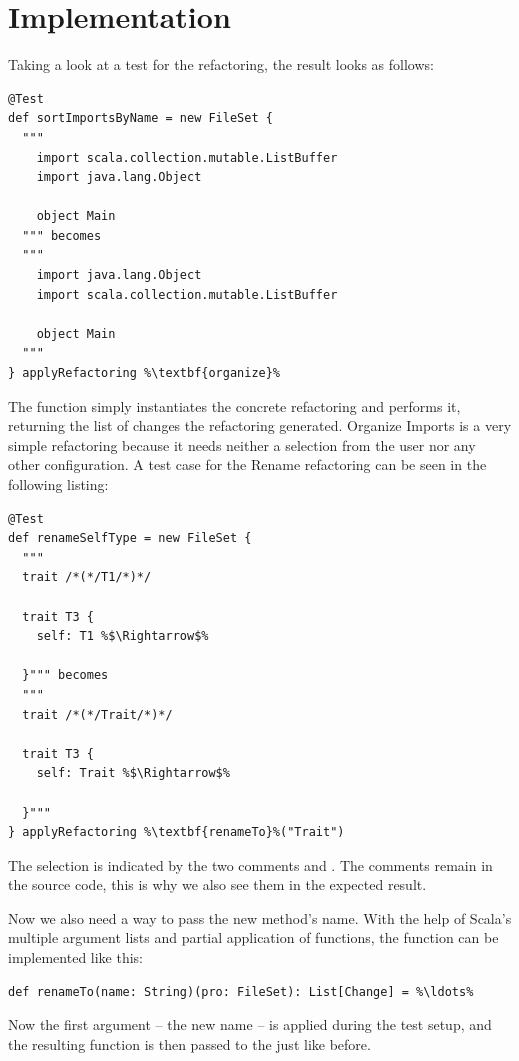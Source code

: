 \documentclass[10pt,a4paper,oneside]{scrreprt}
\begin{document}
\section{Implementation}

Taking a look at a test for the  refactoring, the result looks as follows:
\begin{lstlisting}
@Test
def sortImportsByName = new FileSet {
  """
    import scala.collection.mutable.ListBuffer
    import java.lang.Object

    object Main
  """ becomes
  """
    import java.lang.Object
    import scala.collection.mutable.ListBuffer

    object Main
  """
} applyRefactoring %\textbf{organize}%
\end{lstlisting}

The  function simply instantiates the concrete refactoring and performs it, returning the list of changes the refactoring generated. Organize Imports is a very simple refactoring because it needs neither a selection from the user nor any other configuration. A test case for the Rename refactoring can be seen in the following listing:

\begin{lstlisting}
@Test
def renameSelfType = new FileSet {
  """
  trait /*(*/T1/*)*/

  trait T3 {
    self: T1 %$\Rightarrow$%

  }""" becomes
  """
  trait /*(*/Trait/*)*/

  trait T3 {
    self: Trait %$\Rightarrow$%

  }"""
} applyRefactoring %\textbf{renameTo}%("Trait")
\end{lstlisting}

The selection is indicated by the two comments \src{/*(*/} and \src{/*)*/}. The comments remain in the source code, this is why we also see them in the expected result. 

Now we also need a way to pass the new method's name. With the help of Scala's multiple argument lists and partial application of functions, the  function can be implemented like this:

\begin{lstlisting}
def renameTo(name: String)(pro: FileSet): List[Change] = %\ldots%
\end{lstlisting}

Now the first argument -- the new name -- is applied during the test setup, and the resulting function is then passed to the  just like before.
\end{document}
